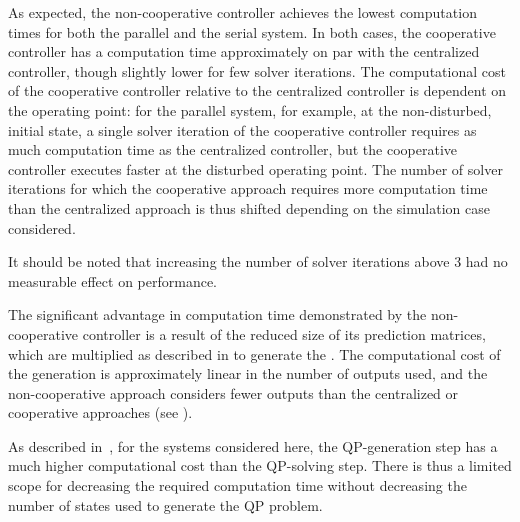 As expected, the non-cooperative controller achieves the lowest computation times for both the parallel and the serial system.
In both cases, the cooperative controller has a computation time approximately on par with the centralized controller, though slightly lower for few solver iterations.
The computational cost of the cooperative controller relative to the centralized controller is dependent on the operating point: for the parallel system, for example, at the non-disturbed, initial state, a single solver iteration of the cooperative controller requires as much computation time as the centralized controller, but the cooperative controller executes faster at the disturbed operating point.
The number of solver iterations for which the cooperative approach requires more computation time than the centralized approach is thus shifted depending on the simulation case considered.

It should be noted that increasing the number of solver iterations above 3 had no measurable effect on performance.

The significant advantage in computation time demonstrated by the non-cooperative controller is a result of the reduced size of its prediction matrices, which are multiplied as described in  to generate the .
The computational cost of the  generation is approximately linear in the number of outputs used, and the non-cooperative approach considers fewer outputs than the centralized or cooperative approaches (see ).

As described in~\cite{jones2016}, for the systems considered here, the QP-generation step has a much higher computational cost than the QP-solving step.
%
There is thus a limited scope for decreasing the required computation time without decreasing the number of states used to generate the QP problem.

